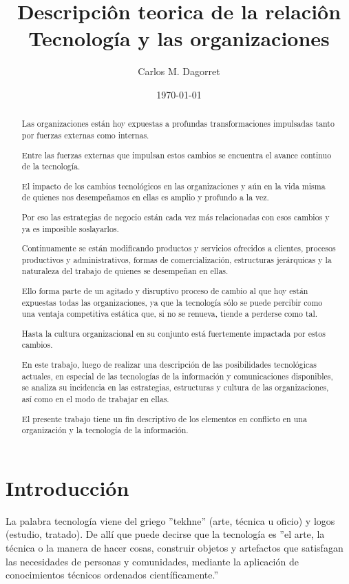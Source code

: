 \documentclass[a4paper, 12pt]{article}
\title{Descripciôn teorica de la relaciôn Tecnología y las organizaciones}
\author{Carlos M. Dagorret}
\date{\today}
\begin{document}
\maketitle
\tableofcontents

\begin{abstract}

Las organizaciones están hoy expuestas a profundas transformaciones impulsadas tanto por fuerzas externas como internas.

Entre las fuerzas externas que impulsan estos cambios se encuentra el avance continuo de la tecnología.

El impacto de los cambios tecnológicos en las organizaciones y aún en la vida misma de quienes nos desempeñamos en ellas es amplio y profundo a la vez.

Por eso las estrategias de negocio están cada vez más relacionadas con esos cambios y ya es imposible soslayarlos.

Continuamente se están modificando productos y servicios ofrecidos a clientes, procesos productivos y administrativos, formas de comercialización, estructuras jerárquicas y la naturaleza del trabajo de quienes se desempeñan en ellas.

Ello forma parte de un agitado y disruptivo proceso de cambio al que hoy están expuestas todas las organizaciones, ya que la tecnología sólo se puede percibir como una ventaja competitiva estática que, si no se renueva, tiende a perderse como tal.

Hasta la cultura organizacional en su conjunto está fuertemente impactada por estos cambios.

En este trabajo, luego de realizar una descripción de las posibilidades tecnológicas actuales, en especial de las tecnologías de la información y comunicaciones disponibles, se analiza su incidencia en las estrategias, estructuras y cultura de las organizaciones, así como en el modo de trabajar en ellas.

El presente trabajo tiene un fin descriptivo de los elementos en conflicto en una organización y la tecnología de la información.
\end{abstract}

\section{Introducción}
\label{sec:Introduccion}

La palabra tecnología viene del griego ''tekhne'' (arte, técnica u oficio) y logos (estudio, tratado). De allí que puede decirse que la tecnología es ''el arte, la técnica o la manera de hacer cosas, construir objetos y artefactos que satisfagan las necesidades de personas y comunidades, mediante la aplicación de conocimientos técnicos ordenados científicamente.''
\end{document}
